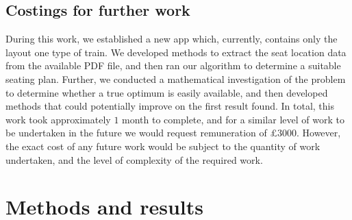 \documentclass[11pt,a4paper]{article}
\begin{document}
\subsection*{Costings for further work}
During this work, we established a new app which, currently, contains only the layout one type of train. We developed methods to extract the seat location data from the available PDF file, and then ran our algorithm to determine a suitable seating plan. Further, we conducted a mathematical investigation of the problem to determine whether a true optimum is easily available, and then developed methods that could potentially improve on the first result found. In total, this work took approximately $1$ month to complete, and for a similar level of work to be undertaken in the future we would request remuneration of £$3000$. However, the exact cost of any future work would be subject to the quantity of work undertaken, and the level of complexity of the required work.



\section*{Methods and results}
\end{document}
